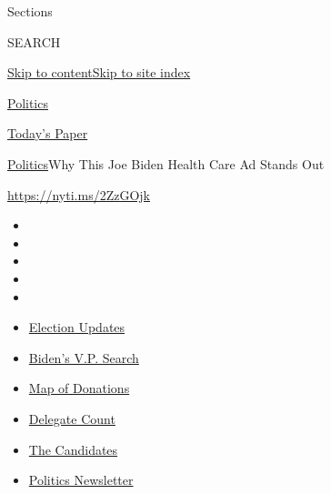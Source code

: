 Sections

SEARCH

\protect\hyperlink{site-content}{Skip to
content}\protect\hyperlink{site-index}{Skip to site index}

\href{https://www.nytimes.com/section/politics}{Politics}

\href{https://myaccount.nytimes.com/auth/login?response_type=cookie\&client_id=vi}{}

\href{https://www.nytimes.com/section/todayspaper}{Today's Paper}

\href{/section/politics}{Politics}\textbar{}Why This Joe Biden Health
Care Ad Stands Out

\url{https://nyti.ms/2ZzGOjk}

\begin{itemize}
\item
\item
\item
\item
\item
\end{itemize}

\begin{itemize}
\item
  \href{https://www.nytimes.com/2020/07/31/us/elections/biden-vs-trump.html?action=click\&pgtype=Article\&state=default\&region=TOP_BANNER\&context=storylines_menu}{Election
  Updates}
\item
  \href{https://www.nytimes.com/article/biden-vice-president-2020.html?action=click\&pgtype=Article\&state=default\&region=TOP_BANNER\&context=storylines_menu}{Biden's
  V.P. Search}
\item
  \href{https://www.nytimes.com/interactive/2020/07/24/us/politics/trump-biden-campaign-donors.html?action=click\&pgtype=Article\&state=default\&region=TOP_BANNER\&context=storylines_menu}{Map
  of Donations}
\item
  \href{https://www.nytimes.com/interactive/2020/us/elections/delegate-count-primary-results.html?action=click\&pgtype=Article\&state=default\&region=TOP_BANNER\&context=storylines_menu}{Delegate
  Count}
\item
  \href{https://www.nytimes.com/interactive/2019/us/politics/2020-presidential-candidates.html?action=click\&pgtype=Article\&state=default\&region=TOP_BANNER\&context=storylines_menu}{The
  Candidates}
\item
  \href{https://www.nytimes.com/newsletters/politics?action=click\&pgtype=Article\&state=default\&region=TOP_BANNER\&context=storylines_menu}{Politics
  Newsletter}
\end{itemize}

